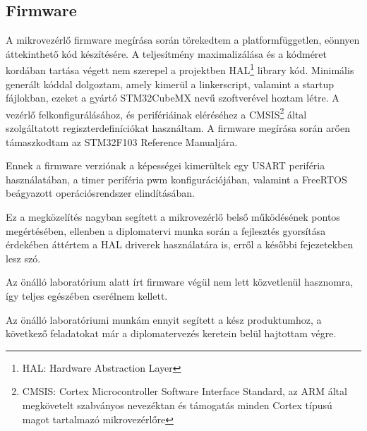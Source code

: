 
\subsection{Firmware}

A mikrovezérlő firmware megírása során törekedtem a platformfüggetlen, eönnyen
áttekinthető kód készítésére. A teljesítmény maximalizálása és a kódméret
kordában tartása végett nem szerepel a projektben HAL\footnote{HAL: Hardware
Abstraction Layer} library kód. Minimális generált kóddal dolgoztam, amely kimerül a
linkerscript, valamint a startup fájlokban, ezeket a gyártó STM32CubeMX nevű
szoftverével hoztam létre. A vezérlő felkonfigurálásához, és perifériáinak
eléréséhez a CMSIS\footnote{CMSIS: Cortex Microcontroller Software Interface
Standard, az ARM által megkövetelt szabványos nevezéktan és támogatás minden
Cortex típusú magot tartalmazó mikrovezérlőre} által szolgáltatott
regiszterdefiníciókat használtam. A firmware megírása során arően támaszkodtam
az STM32F103 Reference Manualjára.

Ennek a firmware verziónak a képességei kimerültek egy USART periféria
használatában, a timer periféria pwm konfigurációjában, valamint a FreeRTOS
beágyazott operációsrendszer elindításában.

Ez a megközelítés nagyban segített a mikrovezérlő belső működésének pontos
megértésében, ellenben a diplomatervi munka során a fejlesztés gyorsítása
érdekében áttértem a HAL driverek használatára is, erről a későbbi fejezetekben
lesz szó.

Az önálló laboratórium alatt írt firmware végül nem lett közvetlenül hasznomra,
így teljes egészében cserélnem kellett.

Az önálló laboratóriumi munkám ennyit segített a kész produktumhoz, a következő
feladatokat már a diplomatervezés keretein belül hajtottam végre.

